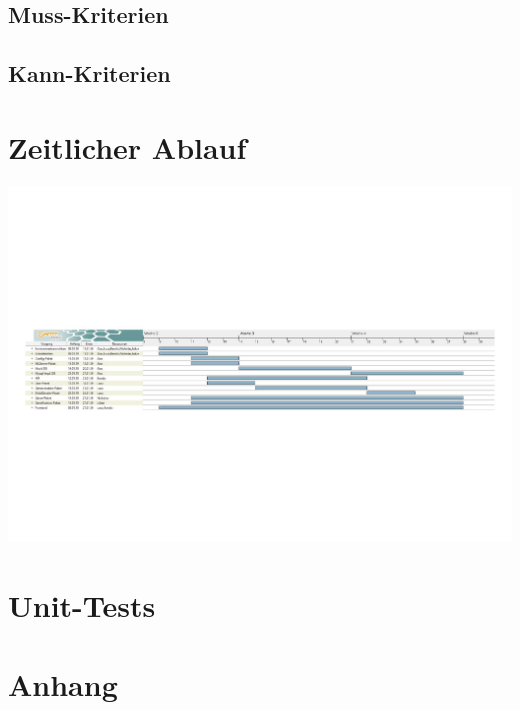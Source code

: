 \documentclass[a4paper]{scrreprt}
\begin{document}
\section{Muss-Kriterien}

\section{Kann-Kriterien}


\chapter{Zeitlicher Ablauf}

\includegraphics[width=\linewidth]{img/gantt.pdf}

\chapter{Unit-Tests}

	
\chapter{Anhang}
\end{document}
